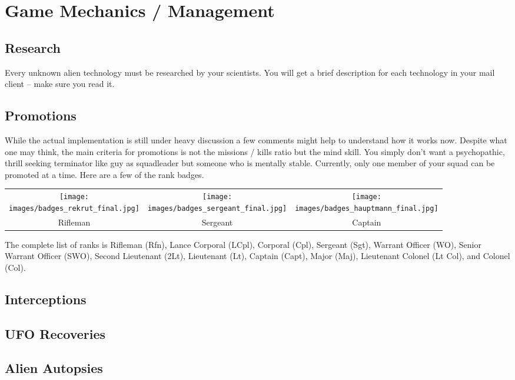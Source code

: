 \section{Game Mechanics / Management}
\subsection{Research}
Every unknown alien technology must be researched by your scientists. You will get a brief description for each technology in your mail client -- make sure you read it.

\subsection{Promotions}
While the actual implementation is still under heavy discussion a few comments might help to understand how it works now. Despite what one may think, the main criteria for promotions is not the missions / kills ratio but the mind skill. You simply don't want a psychopathic, thrill seeking terminator like guy as squadleader but someone who is mentally stable. Currently, only one member of your squad can be promoted at a time.  Here are a few of the rank badges.

\begin{tabular}{ccc}
\texttt{[image: \\images/badges\_rekrut\_final.jpg]} & \texttt{[image: \\images/badges\_sergeant\_final.jpg]} & \texttt{[image: \\images/badges\_hauptmann\_final.jpg]}\\
Rifleman & Sergeant & Captain\\
\end{tabular}

The complete list of ranks is Rifleman (Rfn), Lance Corporal (LCpl), Corporal (Cpl), Sergeant (Sgt), Warrant Officer (WO), Senior Warrant Officer (SWO), Second Lieutenant (2Lt), Lieutenant (Lt), Captain (Capt), Major (Maj), Lieutenant Colonel (Lt Col), and Colonel (Col).

\subsection{Interceptions}

\subsection{UFO Recoveries}

\subsection{Alien Autopsies}
